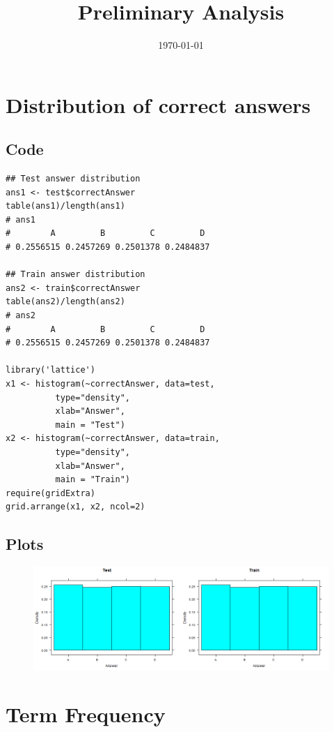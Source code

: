 \documentclass[12pt, oneside]{article}
\title{Preliminary Analysis}
\date{\today}
\begin{document}
\maketitle

\section{Distribution of correct answers}

\subsection{Code}
\begin{lstlisting}
## Test answer distribution
ans1 <- test$correctAnswer
table(ans1)/length(ans1)
# ans1
#        A         B         C         D 
# 0.2556515 0.2457269 0.2501378 0.2484837 

## Train answer distribution
ans2 <- train$correctAnswer
table(ans2)/length(ans2)
# ans2
#        A         B         C         D 
# 0.2556515 0.2457269 0.2501378 0.2484837

library('lattice')
x1 <- histogram(~correctAnswer, data=test,
          type="density",
          xlab="Answer",
          main = "Test")
x2 <- histogram(~correctAnswer, data=train,
          type="density",
          xlab="Answer",
          main = "Train")
require(gridExtra)
grid.arrange(x1, x2, ncol=2)
\end{lstlisting}

\subsection{Plots}
\begin{figure}[h]
\includegraphics[scale=0.5]{./Plots/Rplot01.png}
\centering
\end{figure}

\section{Term Frequency}
\end{document}
